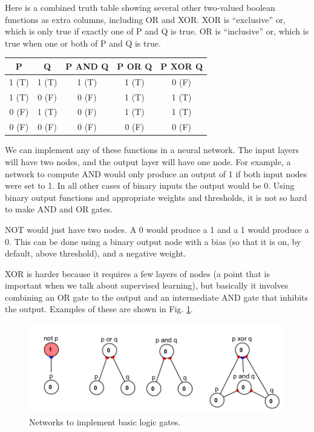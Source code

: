 
Here is a combined truth table showing several other two-valued boolean functions as extra columns, including OR and XOR. XOR is ``exclusive'' or, which is only true if exactly one of P and Q is true. OR is ``inclusive'' or, which is true when one or both of P and Q is true.

\begin{center}
\begin{tabular}{| c | c || c || c || c | }
\hline
  P  & Q & P AND Q  & P OR Q & P XOR Q \\
\hline
  1 (T) & 1 (T) & 1 (T) & 1 (T) & 0 (F) \\
\hline
  1 (T) & 0 (F) & 0 (F) & 1 (T) & 1 (T) \\
\hline
  0 (F) & 1 (T) & 0 (F) & 1 (T) & 1 (T) \\
\hline
 0 (F) & 0 (F) & 0 (F) & 0 (F) & 0 (F) \\
\hline
\end{tabular}
\end{center}

We can implement any of these functions in a neural network. The input layers will have two nodes, and the output layer will have one node. For example, a network to compute AND would only produce an output of 1 if both input nodes were set to 1. In all other cases of binary inputs the output would be 0. Using binary output functions and appropriate weights and thresholds, it is not so hard to make AND and OR gates. 

NOT would just have two nodes. A 0 would produce a 1 and a 1 would produce a 0. This can be done using a binary output node with a bias (so that it is on, by default, above threshold), and a negative weight.

XOR is harder because it requires a few layers of nodes (a point that is important when we talk about supervised learning), but basically it involves combining an OR gate to the output and an intermediate AND gate that inhibits the output. Examples of these are shown in Fig. \ref{logic_gates}.

\begin{figure}[h]
\centering
\includegraphics[scale=.7]{./images/logic_gates.png}
\caption[Simbrain screenshot]{Networks to implement basic logic gates.}
\label{logic_gates}
\end{figure}

